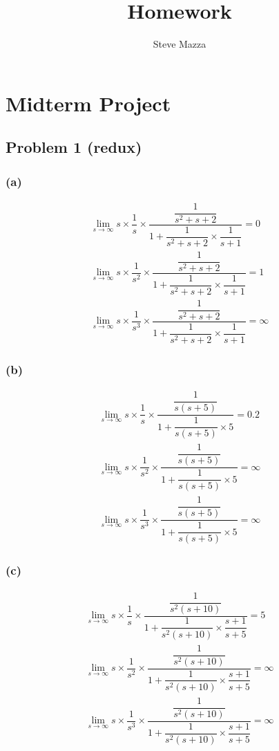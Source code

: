 \documentclass[letterpaper,10pt]{article}
\title{Homework}
\author{Steve Mazza}
\begin{document}
\maketitle

\section*{Midterm Project}
\subsection*{Problem 1 (redux)}
\subsubsection*{(a)}
\begin{align*}
\lim_{s\to\infty}s\times\dfrac{1}{s}\times\dfrac{\dfrac{1}{s^2+s+2}}{1+\dfrac{1}{s^2+s+2}\times\dfrac{1}{s+1}}=0 \\
\lim_{s\to\infty}s\times\dfrac{1}{s^2}\times\dfrac{\dfrac{1}{s^2+s+2}}{1+\dfrac{1}{s^2+s+2}\times\dfrac{1}{s+1}}=1 \\
\lim_{s\to\infty}s\times\dfrac{1}{s^3}\times\dfrac{\dfrac{1}{s^2+s+2}}{1+\dfrac{1}{s^2+s+2}\times\dfrac{1}{s+1}}=\infty
\end{align*}

\subsubsection*{(b)}
\begin{align*}
\lim_{s\to\infty}s\times\dfrac{1}{s}\times\dfrac{\dfrac{1}{s(s+5)}}{1+\dfrac{1}{s(s+5)}\times5}=0.2 \\
\lim_{s\to\infty}s\times\dfrac{1}{s^2}\times\dfrac{\dfrac{1}{s(s+5)}}{1+\dfrac{1}{s(s+5)}\times5}=\infty \\
\lim_{s\to\infty}s\times\dfrac{1}{s^3}\times\dfrac{\dfrac{1}{s(s+5)}}{1+\dfrac{1}{s(s+5)}\times5}=\infty
\end{align*}

\subsubsection*{(c)}
\begin{align*}
\lim_{s\to\infty}s\times\dfrac{1}{s}\times\dfrac{\dfrac{1}{s^2(s+10)}}{1+\dfrac{1}{s^2(s+10)}\times\dfrac{s+1}{s+5}}=5 \\
\lim_{s\to\infty}s\times\dfrac{1}{s^2}\times\dfrac{\dfrac{1}{s^2(s+10)}}{1+\dfrac{1}{s^2(s+10)}\times\dfrac{s+1}{s+5}}=\infty \\
\lim_{s\to\infty}s\times\dfrac{1}{s^3}\times\dfrac{\dfrac{1}{s^2(s+10)}}{1+\dfrac{1}{s^2(s+10)}\times\dfrac{s+1}{s+5}}=\infty
\end{align*}
\end{document}
